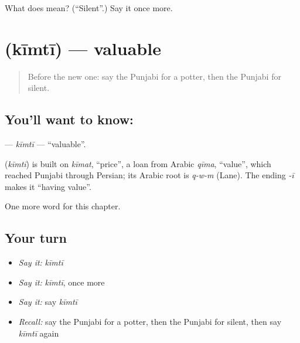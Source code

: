 \begin{tcolorbox}[breakable,colback=teal!4,colframe=teal!35!black,title={Before you move on}]
What does  mean? (\textquotedblleft{}Silent\textquotedblright{}.) Say it once more.
\end{tcolorbox}
\section[\texorpdfstring{\pa{ਕੀਮਤੀ} (kīmtī)}{ਕੀਮਤੀ (kīmtī)}]{ (kīmtī) — valuable}

\label{lesson:PA-C140-kimti}



\begin{quote}
Before the new one: say the Punjabi for a potter, then the Punjabi for silent.
\end{quote}

\subsection*{You'll want to know: }
\textbf{} — \emph{kīmtī} — \textquotedblleft{}valuable\textquotedblright{}.

\begin{cousinweb}
\textbf{} (\emph{kīmtī}) is built on \emph{kīmat}, \textquotedblleft{}price\textquotedblright{}, a loan from Arabic \emph{qīma}, \textquotedblleft{}value\textquotedblright{}, which reached Punjabi through Persian; its Arabic root is \emph{q-w-m} (Lane). The ending \emph{-ī} makes it \textquotedblleft{}having value\textquotedblright{}.
\end{cousinweb}

\begin{grammarlens}[title={What you've built}]
One more word for this chapter.
\end{grammarlens}

\subsection*{Your turn}
\begin{itemize}
\raggedright
  \item \emph{Say it:} \emph{kīmtī}
  \item \emph{Say it:} \emph{kīmtī}, once more
  \item \emph{Say it:} say \emph{kīmtī}
  \item \emph{Recall:} say the Punjabi for a potter, then the Punjabi for silent, then say \emph{kīmtī} again
\end{itemize}

